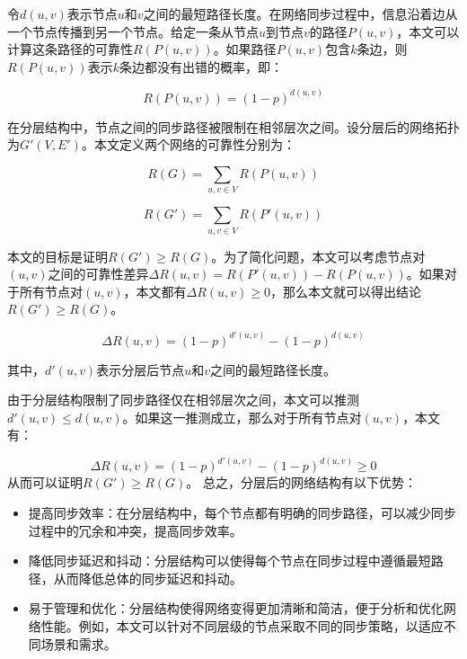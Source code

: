 \documentclass[UTF8,a4paper,12pt]{ctexart}
\numberwithin{equation}{section}
\begin{document}
	令$d(u, v)$表示节点$u$和$v$之间的最短路径长度。在网络同步过程中，信息沿着边从一个节点传播到另一个节点。给定一条从节点$u$到节点$v$的路径$P(u, v)$，本文可以计算这条路径的可靠性$R(P(u, v))$。如果路径$P(u, v)$包含$k$条边，则$R(P(u, v))$表示$k$条边都没有出错的概率，即：
	
	\begin{equation}
		R(P(u, v)) = (1 - p)^{d(u,v)}
	\end{equation}
	
	在分层结构中，节点之间的同步路径被限制在相邻层次之间。设分层后的网络拓扑为$G'(V, E')$。本文定义两个网络的可靠性分别为：
	
	\begin{equation}
		R(G) = \sum_{u, v \in V} R(P(u, v))
	\end{equation}
	
	\begin{equation}
		R(G') = \sum_{u, v \in V} R(P'(u, v))
	\end{equation}
	
	本文的目标是证明$R(G') \ge R(G)$。为了简化问题，本文可以考虑节点对$(u, v)$之间的可靠性差异$\Delta R(u, v) = R(P'(u, v)) - R(P(u, v))$。如果对于所有节点对$(u, v)$，本文都有$\Delta R(u, v) \ge 0$，那么本文就可以得出结论$R(G') \ge R(G)$。
	
	\begin{equation}
		\Delta R(u, v) = (1 - p)^{d'(u,v)} - (1 - p)^{d(u,v)}
	\end{equation}
	
	其中，$d'(u,v)$表示分层后节点$u$和$v$之间的最短路径长度。
	
	由于分层结构限制了同步路径仅在相邻层次之间，本文可以推测$d'(u,v) \le d(u,v)$。如果这一推测成立，那么对于所有节点对$(u, v)$，本文有：
	
	\begin{equation}
		\Delta R(u, v) = (1 - p)^{d'(u,v)} - (1 - p)^{d(u,v)} \ge 0
	\end{equation}
	从而可以证明$R(G') \ge R(G)$。
	总之，分层后的网络结构有以下优势：
	\begin{itemize}
		\item 提高同步效率：在分层结构中，每个节点都有明确的同步路径，可以减少同步过程中的冗余和冲突，提高同步效率。
		\item 降低同步延迟和抖动：分层结构可以使得每个节点在同步过程中遵循最短路径，从而降低总体的同步延迟和抖动。
		\item 易于管理和优化：分层结构使得网络变得更加清晰和简洁，便于分析和优化网络性能。例如，本文可以针对不同层级的节点采取不同的同步策略，以适应不同场景和需求。
	\end{itemize}
	
\end{document}
